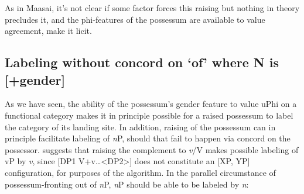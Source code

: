 \documentclass[output=paper
,modfonts
,nonflat]{langsci/langscibook}
\begin{document}
\begin{figure}[!h]
	\begin{exe}
	\end{exe}
\end{figure}
\newpage\noindent As in Maasai, it’s not clear if some factor forces this raising but nothing in theory precludes it, and the phi-features of the possessum are available to value agreement, make it licit.

\subsection{Labeling without concord on ‘of’ where N is [+gender]} \label{sec:6.5}
As we have seen, the ability of the possessum’s gender feature to value uPhi on a functional category makes it in principle possible for a raised possessum to label the category of its landing site. In addition, raising of the possessum can in principle facilitate labeling of \textit{n}P, should that fail to happen via concord on the possessor. \citet[44]{Chomsky2013} suggests that raising the complement to \textit{v}/V makes possible labeling of vP by \textit{v}, since [DP1 V+v…<DP2>] does not constitute an [XP, YP] configuration, for purposes of the algorithm. In the parallel circumstance of possessum-fronting out of \textit{n}P, \textit{n}P should be able to be labeled by \textit{n}:
\end{document}

